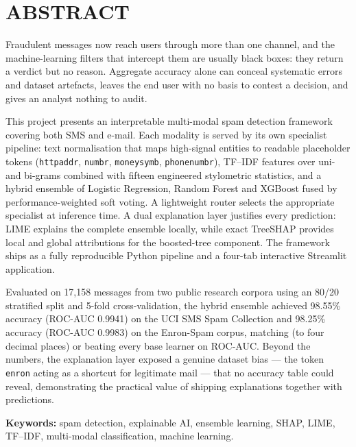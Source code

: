 \documentclass[12pt,a4paper]{report}
\newcommand{\frontchapter}[1]{%
  \chapter*{#1}\phantomsection\addcontentsline{toc}{chapter}{#1}%
}
\begin{document}
\listoftables
\clearpage

\frontchapter{ABSTRACT}

Fraudulent messages now reach users through more than one channel, and the
machine-learning filters that intercept them are usually black boxes: they
return a verdict but no reason. Aggregate accuracy alone can conceal
systematic errors and dataset artefacts, leaves the end user with no basis to
contest a decision, and gives an analyst nothing to audit.

This project presents an interpretable multi-modal spam detection framework
covering both SMS and e-mail. Each modality is served by its own specialist
pipeline: text normalisation that maps high-signal entities to readable
placeholder tokens (\texttt{httpaddr}, \texttt{numbr}, \texttt{moneysymb},
\texttt{phonenumbr}), TF--IDF features over uni- and bi-grams combined with
fifteen engineered stylometric statistics, and a hybrid ensemble of Logistic
Regression, Random Forest and XGBoost fused by performance-weighted soft
voting. A lightweight router selects the appropriate specialist at inference
time. A dual explanation layer justifies every prediction: LIME explains the
complete ensemble locally, while exact TreeSHAP provides local and global
attributions for the boosted-tree component. The framework ships as a fully
reproducible Python pipeline and a four-tab interactive Streamlit application.

Evaluated on 17,158 messages from two public research corpora using an 80/20
stratified split and 5-fold cross-validation, the hybrid ensemble achieved
98.55\% accuracy (ROC-AUC 0.9941) on the UCI SMS Spam Collection and 98.25\%
accuracy (ROC-AUC 0.9983) on the Enron-Spam corpus, matching (to four
decimal places) or beating every base learner on ROC-AUC. Beyond the numbers, the explanation layer exposed a
genuine dataset bias --- the token \texttt{enron} acting as a shortcut for
legitimate mail --- that no accuracy table could reveal, demonstrating the
practical value of shipping explanations together with predictions.

\vspace{12pt}
\textbf{Keywords:} spam detection, explainable AI, ensemble learning, SHAP,
LIME, TF--IDF, multi-modal classification, machine learning.
\end{document}
